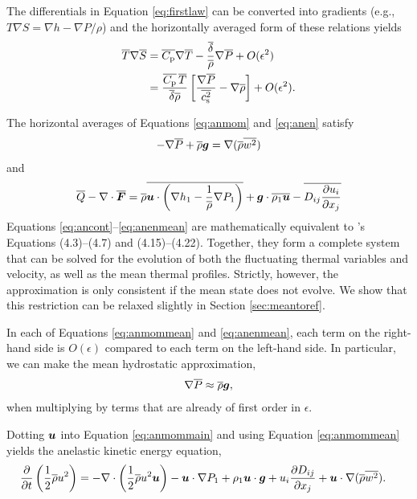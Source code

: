 \documentclass[12pt]{article}
\newcommand{\vecf}{\bm{F}}
\begin{document}
   The differentials in Equation \eqref{eq:firstlaw} can be converted into gradients (e.g., $T\nabla S= \nabla h - \nabla P/\rho$) and the horizontally averaged form of these relations yields 
  \begin{subequations}\label{eq:anfirstlawmean}
  	\begin{align}
  		\overline{T}\nabla\overline{S} &= \overline{C_{\rm{p}}}\nabla\overline{T} - \frac{\overline{\delta}}{\overline{\rho}}\nabla\overline{P} + O(\epsilon^2)\\
  		&= \frac{\overline{C_{\rm{p}}}\,\overline{T}}{\overline{\delta}\overline{\rho}}\left[\frac{\nabla\overline{P}}{\overline{c_{\rm s}^2}}-\nabla\overline{\rho}\right]+O(\epsilon^2).
  	\end{align}
  \end{subequations}
  
   The horizontal averages of Equations \eqref{eq:anmom} and \eqref{eq:anen} satisfy 
  \begin{align}\label{eq:anmommean}
  	-\nabla\overline{P} + \overline{\rho}\bm{g} = \nabla(\overline{\rho} \overline{w^2})
  \end{align}
  and
  \begin{align}\label{eq:anenmean}
  	\heatover - \Div\overline{\vecf} = \rhoover\overline{\vecu\cdot\left(\nabla \enthone-\frac{1}{\rhoover}\nabla \prsone\right)} + \vecg\cdot\overline{\rhoone\vecu} - \overline{D_{ij}\pderiv{u_i}{x_j}}
  \end{align}
   Equations \eqref{eq:ancont}--\eqref{eq:anenmean} are mathematically equivalent to \citet{Gough1969}'s Equations (4.3)--(4.7) and (4.15)--(4.22). Together, they form a complete system that can be solved for the evolution of both the fluctuating thermal variables and velocity, as well as the mean thermal profiles. Strictly, however, the approximation is only consistent if the mean state does not evolve. We show that this restriction can be relaxed slightly in Section \ref{sec:meantoref}. 
  
  In each of Equations \eqref{eq:anmommean} and \eqref{eq:anenmean}, each term on the right-hand side is $O(\epsilon)$ compared to each term on the left-hand side. In particular, we can make the mean hydrostatic approximation, 
  \begin{align}\label{eq:anhydrostatic}
  	\nabla\overline{P}\approx \overline{\rho}\bm{g},
  \end{align}
  when multiplying by terms that are already of first order in $\epsilon$. 
  
Dotting $\bm{u}$ into Equation \eqref{eq:anmommain} and using Equation \eqref{eq:anmommean} yields the anelastic kinetic energy equation,
	\begin{align}\label{eq:anke}
		\frac{\partial}{\partial t}\left(\frac{1}{2}\overline{\rho} u^2\right)&=-\nabla\cdot\left(\frac{1}{2}\overline{\rho} u^2\bm{u} \right) - \bm{u}\cdot\nabla P_1 + \rho_1\bm{u}\cdot\bm{g} + u_i\frac{\partial D_{ij}}{\partial x_j} + \bm{u}\cdot\nabla(\overline{\rho} \overline{w^2}).
	\end{align}
\end{document}
